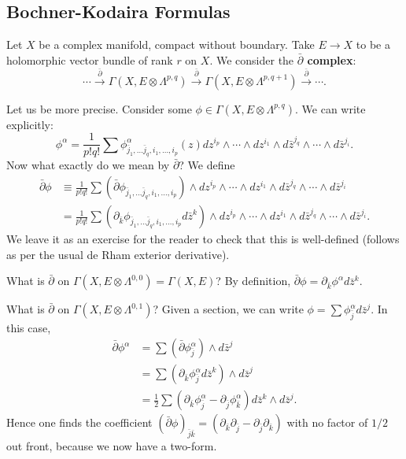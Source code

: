 \documentclass{../mathnotes}
\begin{document}
\subsection{Bochner-Kodaira Formulas}

Let $X$ be a complex manifold, compact without boundary. Take $E\to X$ to be a holomorphic vector bundle of rank $r$ on $X$.
We consider the \textbf{$\bar\partial$ complex}:
\[\cdots\xrightarrow{\bar\partial}\Gamma(X,E\otimes\Lambda^{p,q})\xrightarrow{\bar\partial}\Gamma(X,E\otimes\Lambda^{p,q+1})\xrightarrow{\bar\partial}\cdots.\]

Let us be more precise. Consider some $\phi\in\Gamma(X,E\otimes\Lambda^{p,q})$. We can write explicitly:
\[\phi^\alpha=\frac{1}{p!q!}\sum\phi^\alpha_{\bar j_1,\ldots\bar j_q,i_1,\ldots,i_p}(z)dz^{i_p}\wedge\cdots\wedge dz^{i_1}\wedge d\bar z^{j_q}\wedge\cdots\wedge d\bar z^{j_i}.\]
Now what exactly do we mean by $\bar\partial$? We define
\begin{align*}
    \bar\partial\phi&\equiv\frac{1}{p!q!}\sum\left(\bar\partial\phi_{\bar j_1,\ldots\bar j_q,i_1,\ldots,i_p}\right)\wedge dz^{i_p}\wedge\cdots\wedge dz^{i_1}\wedge d\bar z^{j_q}\wedge\cdots\wedge d\bar z^{j_i}\\
    &=\frac{1}{p!q!}\sum\left(\partial_{\bar k}\phi_{\bar j_1,\ldots\bar j_q,i_1,\ldots,i_p}d\bar z^k\right)\wedge dz^{i_p}\wedge\cdots\wedge dz^{i_1}\wedge d\bar z^{j_q}\wedge\cdots\wedge     d\bar z^{j_i}.
\end{align*}
We leave it as an exercise for the reader to check that this is well-defined (follows as per the usual de Rham exterior derivative).

\begin{exmp}
    What is $\bar\partial$ on $\Gamma(X,E\otimes\Lambda^{0,0})=\Gamma(X,E)$? By definition, $\bar\partial\phi=\partial_{\bar k}\phi^\alpha d\bar z^k$.
\end{exmp}
\begin{exmp}
    What is $\bar\partial$ on $\Gamma(X,E\otimes\Lambda^{0,1})$? Given a section, we can write $\phi=\sum \phi^\alpha_{\bar j}d\bar z^j$.
    In this case,
    \begin{align*}
        \bar\partial\phi^\alpha&=\sum\left( \bar\partial \phi^\alpha_{\bar j} \right)\wedge d\bar z^j\\
        &=\sum\left( \partial_{\bar k}\phi^{\alpha}_{\bar j}d\bar z^k \right)\wedge d\bar z^j\\
        &=\frac{1}{2}\sum\left( \partial_{\bar k}\phi_{\bar j}^\alpha-\partial_{\bar j}\phi^{\alpha}_{\bar k} \right)d\bar z^k\wedge d\bar z^j.
    \end{align*}
    Hence one finds the coefficient $(\bar\partial \phi)_{\bar j\bar k}=\left(\partial_{\bar k}\partial_{\bar j}-\partial_{\bar j}\partial_{\bar k}\right)$
    with no factor of $1/2$ out front, because we now have a two-form.
\end{exmp}
\end{document}

